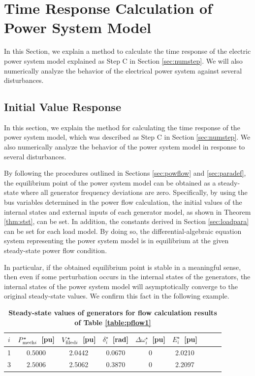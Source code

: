 \documentclass[graybox, envcountchap]{svmult}
\begin{document}
\section{Time Response Calculation of Power System Model}\label{sec:numsimtr}

In this Section, we explain a method to calculate the time response of the
electric power system model explained as Step C in Section \ref{sec:numstep}.
We will also numerically analyze the behavior of the electrical power system
against several disturbances.

\subsection{Initial Value Response}

In this section, we explain the method for calculating the time response of the
power system model, which was described as Step C in Section \ref{sec:numstep}.
We also numerically analyze the behavior of the power system model in response
to several disturbances.

By following the procedures outlined in Sections \ref{sec:powflow} and
\ref{sec:paradef}, the equilibrium point of the power system model can be
obtained as a steady-state where all generator frequency deviations are zero.
Specifically, by using the bus variables determined in the power flow
calculation, the initial values of the internal states and external inputs of
each generator model, as shown in Theorem \ref{thm:stst}, can be set. In
addition, the constants derived in Section \ref{sec:loadpara} can be set for
each load model. By doing so, the differential-algebraic equation system
representing the power system model is in equilibrium at the given steady-state
power flow condition.

In particular, if the obtained equilibrium point is stable in a meaningful
sense, then even if some perturbation occurs in the internal states of the
generators, the internal states of the power system model will asymptotically
converge to the original steady-state values. We confirm this fact in the
following example.

\begin{table}[h]
\medskip
 \caption{\textbf{Steady-state values of generators for flow calculation results of Table \ref{table:pflow1}}}
 \label{table:genst13a}
 \centering
  \begin{tabular}{ccccccccc}
   \hline
$i$ &  $P_{{\rm mech}i}^{\star}$~[pu] & $V_{{\rm filed}i}^{\star}$~[pu] & $\delta_i^{\star}$~[rad] & $\Delta \omega_i^{\star}$~[pu] & $E_i^{\star}$~[pu] \\
   \hline \hline
1 & $0.5000$ & 2.0442 & 0.0670 & 0 & 2.0210 \\
3 & $2.5006$ & 2.5062 & 0.3870 & 0 & 2.2097 \\
   \hline
  \end{tabular}
\end{table}
\end{document}
